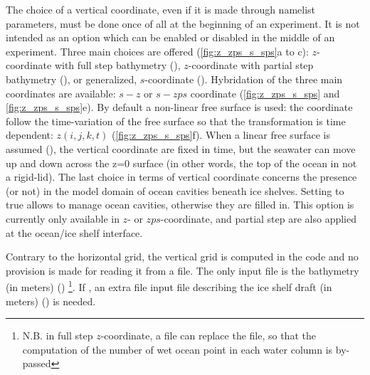 \documentclass[../main/NEMO_manual]{subfiles}
\begin{document}
The choice of a vertical coordinate, even if it is made through  namelist parameters, 
must be done once of all at the beginning of an experiment.
It is not intended as an option which can be enabled or disabled in the middle of an experiment.
Three main choices are offered (\autoref{fig:z_zps_s_sps}a to c):
$z$-coordinate with full step bathymetry (),
$z$-coordinate with partial step bathymetry (),
or generalized, $s$-coordinate ().
Hybridation of the three main coordinates are available:
$s-z$ or $s-zps$ coordinate (\autoref{fig:z_zps_s_sps} and \autoref{fig:z_zps_s_sps}e).
By default a non-linear free surface is used: the coordinate follow the time-variation of the free surface so that
the transformation is time dependent: $z(i,j,k,t)$ (\autoref{fig:z_zps_s_sps}f).
When a linear free surface is assumed (),
the vertical coordinate are fixed in time, but the seawater can move up and down across the z=0 surface
(in other words, the top of the ocean in not a rigid-lid). 
The last choice in terms of vertical coordinate concerns the presence (or not) in
the model domain of ocean cavities beneath ice shelves.
Setting  to true allows to manage ocean cavities, otherwise they are filled in.
This option is currently only available in $z$- or $zps$-coordinate,
and partial step are also applied at the ocean/ice shelf interface.

Contrary to the horizontal grid, the vertical grid is computed in the code and
no provision is made for reading it from a file.
The only input file is the bathymetry (in meters) ()
\footnote{
  N.B. in full step $z$-coordinate, a  file can replace the  file,
  so that the computation of the number of wet ocean point in each water column is by-passed
}. 
If ,
an extra file input file describing the ice shelf draft (in meters) () is needed.
\end{document}
